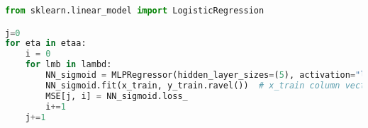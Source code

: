 \begin{lstlisting}[language=Python]
from sklearn.linear_model import LogisticRegression

j=0
for eta in etaa:
    i = 0
    for lmb in lambd:
        NN_sigmoid = MLPRegressor(hidden_layer_sizes=(5), activation="logistic", solver="sgd", alpha=lmb, batch_size = batch_size, learning_rate_init = eta, momentum = 0, max_iter=n_epochs ,n_iter_no_change=2000)
        NN_sigmoid.fit(x_train, y_train.ravel())  # x_train column vector with input values, y_train column vector with target values
        MSE[j, i] = NN_sigmoid.loss_  
        i+=1
    j+=1
\end{lstlisting}

